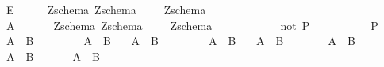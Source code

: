 \begin{isabellebody}
\ \ {\isachardoublequoteopen}{\isacharpercent}E{}{\isachardoublequoteclose}\ \ \ \ \ {\isacharcolon}{\isacharcolon}\ {\isachardoublequoteopen}{\isacharbrackleft}Zschema{\isacharcomma}\ Zschema{\isacharbrackright}\ \ \ \ {\isacharequal}{\isachargreater}\ Zschema{\isachardoublequoteclose}\ {\isacharparenleft}{\isachardoublequoteopen}{\isasymSexistsone}\ {\isacharparenleft}{}{\isacharunderscore}{\isacharparenright}\ {\isasymspot}\ {\isacharparenleft}{\isacharunderscore}{\isacharparenright}{\isachardoublequoteclose}\ \ \ {\isacharbrackleft}{}{}{\isacharcomma}{}{}{\isacharbrackright}{}{}{\isacharparenright}\isanewline
\ \ {\isachardoublequoteopen}{\isacharpercent}A{\isachardoublequoteclose}\ \ \ \ \ \ {\isacharcolon}{\isacharcolon}\ {\isachardoublequoteopen}{\isacharbrackleft}Zschema{\isacharcomma}\ Zschema{\isacharbrackright}\ \ \ \ {\isacharequal}{\isachargreater}\ Zschema{\isachardoublequoteclose}\ {\isacharparenleft}{\isachardoublequoteopen}{\isasymSforall}\ {\isacharparenleft}{}{\isacharunderscore}{\isacharparenright}\ {\isasymspot}\ {\isacharparenleft}{\isacharunderscore}{\isacharparenright}{\isachardoublequoteclose}\ \ \ \ {\isacharbrackleft}{}{}{\isacharcomma}{}{}{\isacharbrackright}{}{}{\isacharparenright}\isanewline
\ \isanewline
\isanewline
{}\isamarkupfalse%
\isanewline
\isanewline
\ \ {\isachardoublequoteopen}{\isacharpercent}not\ P{\isachardoublequoteclose}\ \ \ \ \ \ \ \ \ {\isacharequal}{\isachargreater}\ {\isachardoublequoteopen}{\isachartilde}\ P{\isachardoublequoteclose}\ \isanewline
\ \ {\isachardoublequoteopen}A\ {\isacharbackslash}{\isacharslash}\ B{\isachardoublequoteclose}\ \ \ \ \ \ \ \ {\isacharequal}{\isachargreater}\ {\isachardoublequoteopen}A\ {\isacharbar}\ B{\isachardoublequoteclose}\ \isanewline
\ \ {\isachardoublequoteopen}A\ {\isacharslash}{\isacharbackslash}\ B{\isachardoublequoteclose}\ \ \ \ \ \ \ \ {\isacharequal}{\isachargreater}\ {\isachardoublequoteopen}A\ {\isacharampersand}\ B{\isachardoublequoteclose}\ \isanewline
\ \ {\isachardoublequoteopen}A\ {\isacharequal}{\isacharplus}{\isacharequal}{\isachargreater}\ B{\isachardoublequoteclose}\ \ \ \ \ \ \ {\isacharequal}{\isachargreater}\ {\isachardoublequoteopen}A\ {\isacharminus}{\isacharminus}{\isachargreater}\ B{\isachardoublequoteclose}\ \isanewline
\ \ {\isachardoublequoteopen}A\ {\isacharless}{\isacharequal}{\isacharplus}{\isacharequal}{\isachargreater}\ B{\isachardoublequoteclose}\ \ \ \ \ \ {\isacharequal}{\isachargreater}\ {\isachardoublequoteopen}A\ {\isacharequal}\ B{\isachardoublequoteclose}\ \isanewline

\end{isabellebody}

